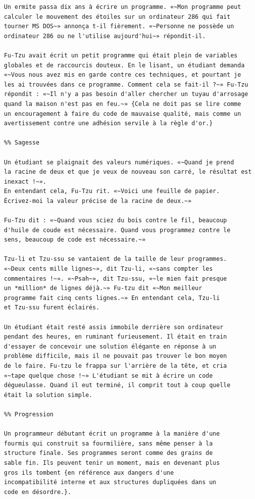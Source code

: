 \documentclass{FramateX}
\begin{document}
\begin{lstlisting}
Un ermite passa dix ans à écrire un programme. «~Mon programme peut
calculer le mouvement des étoiles sur un ordinateur 286 qui fait
tourner MS DOS~» annonça t-il fièrement. «~Personne ne possède un
ordinateur 286 ou ne l'utilise aujourd'hui~» répondit-il.

Fu-Tzu avait écrit un petit programme qui était plein de variables
globales et de raccourcis douteux. En le lisant, un étudiant demanda
«~Vous nous avez mis en garde contre ces techniques, et pourtant je
les ai trouvées dans ce programme. Comment cela se fait-il ?~» Fu-Tzu
répondit : «~Il n'y a pas besoin d'aller chercher un tuyau d'arrosage
quand la maison n'est pas en feu.~» {Cela ne doit pas se lire comme
un encouragement à faire du code de mauvaise qualité, mais comme un
avertissement contre une adhésion servile à la règle d'or.}

%% Sagesse

Un étudiant se plaignait des valeurs numériques. «~Quand je prend
la racine de deux et que je veux de nouveau son carré, le résultat est
inexact !~».
En entendant cela, Fu-Tzu rit. «~Voici une feuille de papier.
Écrivez-moi la valeur précise de la racine de deux.~»

Fu-Tzu dit : «~Quand vous sciez du bois contre le fil, beaucoup
d'huile de coude est nécessaire. Quand vous programmez contre le
sens, beaucoup de code est nécessaire.~»

Tzu-li et Tzu-ssu se vantaient de la taille de leur programmes.
«~Deux cents mille lignes~», dit Tzu-li, «~sans compter les
commentaires !~». «~Psah~», dit Tzu-ssu, «~le mien fait presque
un *million* de lignes déjà.~» Fu-tzu dit «~Mon meilleur
programme fait cinq cents lignes.~» En entendant cela, Tzu-li
et Tzu-ssu furent éclairés.

Un étudiant était resté assis immobile derrière son ordinateur
pendant des heures, en ruminant furieusement. Il était en train
d'essayer de concevoir une solution élégante en réponse à un
problème difficile, mais il ne pouvait pas trouver le bon moyen
de le faire. Fu-tzu le frappa sur l'arrière de la tête, et cria
«~tape quelque chose !~» L'étudiant se mit à écrire un code
dégueulasse. Quand il eut terminé, il comprit tout à coup quelle
était la solution simple.

%% Progression

Un programmeur débutant écrit un programme à la manière d'une
fourmis qui construit sa fourmilière, sans même penser à la
structure finale. Ses programmes seront comme des grains de
sable fin. Ils peuvent tenir un moment, mais en devenant plus
gros ils tombent {en référence aux dangers d'une
incompatibilité interne et aux structures dupliquées dans un
code en désordre.}.


\end{lstlisting}
\end{document}
